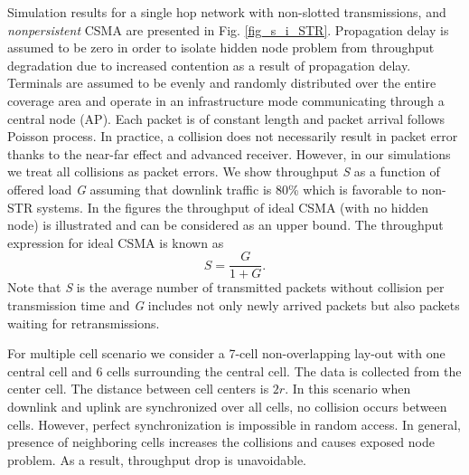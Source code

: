 \documentclass[twocolumn]{IEEEtran}
\begin{document}
Simulation results for a single hop network with non-slotted
transmissions, and \textit{nonpersistent} CSMA \cite{csma} are
presented in Fig. \ref{fig_s_i_STR}. Propagation delay is assumed to
be zero in order to isolate hidden node problem from throughput
degradation due to increased contention as a result of propagation
delay. Terminals are assumed to be evenly and randomly distributed
over the entire coverage area and operate in an infrastructure mode
communicating through a central node (AP). Each packet is of
constant length and packet arrival follows Poisson process. In
practice, a collision does not necessarily result in packet error
thanks to the near-far effect and advanced receiver. However, in our
simulations we treat all collisions as packet errors. We show
throughput \textit{S} as a function of offered load \textit{G}
assuming that downlink traffic is 80\% which is favorable to non-STR
systems. In the figures the throughput of ideal CSMA (with no hidden
node) is illustrated and can be considered as an upper bound. The
throughput expression for ideal CSMA is known as
\begin{equation}
S=\frac{G}{1+G}.
\end{equation}
Note that \textit{S} is the average number of transmitted packets
without collision per transmission time and \textit{G} includes not
only newly arrived packets but also packets waiting for
retransmissions.

For multiple cell scenario we consider a 7-cell non-overlapping
lay-out with one central cell and 6 cells surrounding the central
cell. The data is collected from the center cell. The distance
between cell centers is $2r$. In this scenario when downlink and
uplink are synchronized over all cells, no collision occurs between
cells. However, perfect synchronization is impossible in random
access. In general, presence of neighboring cells increases the
collisions and causes exposed node problem. As a result, throughput
drop is unavoidable.
\end{document}

